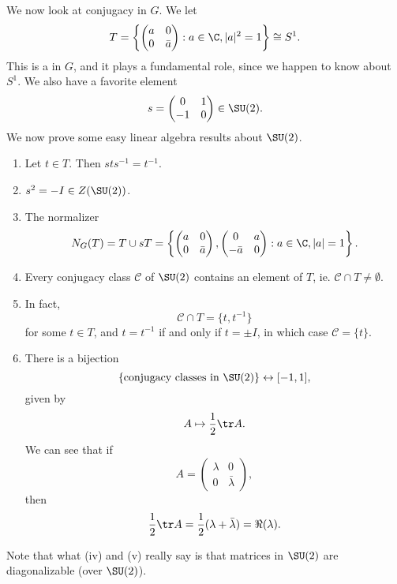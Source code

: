 \documentclass[a4paper]{article}
\begin{document}
We now look at conjugacy in $G$. We let
\[
  T = \left\{
    \begin{pmatrix}
      a & 0\\
      0 & \bar{a}
    \end{pmatrix}: a \in \C, |a|^2 = 1
  \right\} \cong S^1.
\]
This is a  in $G$, and it plays a fundamental role, since we happen to know about $S^1$. We also have a favorite element
\[
  s =
  \begin{pmatrix}
    0 & 1\\
    -1 & 0
  \end{pmatrix} \in \SU(2).
\]
We now prove some easy linear algebra results about $\SU(2)$.
\begin{lemma}\leavevmode
  \begin{enumerate}
    \item Let $t \in T$. Then $sts^{-1} = t^{-1}$.
    \item $s^2 = -I \in Z(\SU(2))$.
    \item The normalizer
      \[
        N_G(T) = T \cup sT =
        \left\{
          \begin{pmatrix}
            a & 0\\
            0 & \bar{a}
          \end{pmatrix},
          \begin{pmatrix}
            0 & a\\
            -\bar{a} & 0
          \end{pmatrix}: a \in \C, |a| = 1\right\}.
      \]
    \item Every conjugacy class $\mathcal{C}$ of $\SU(2)$ contains an element of $T$, ie. $\mathcal{C} \cap T \not= \emptyset$.

    \item In fact,
      \[
        \mathcal{C} \cap T = \{t, t^{-1}\}
      \]
      for some $t \in T$, and $t = t^{-1}$ if and only if $t = \pm I$, in which case $\mathcal{C} = \{t\}$.
    \item There is a bijection
      \[
        \{\text{conjugacy classes in }\SU(2)\} \leftrightarrow [-1, 1],
      \]
      given by
      \[
        A \mapsto \frac{1}{2} \tr A.
      \]
      We can see that if
      \[
        A =
        \begin{pmatrix}
          \lambda & 0\\
          0 & \bar{\lambda}
        \end{pmatrix},
      \]
      then
      \[
        \frac{1}{2}\tr A = \frac{1}{2}(\lambda + \bar{\lambda}) = \Re(\lambda).
      \]
  \end{enumerate}
\end{lemma}
Note that what (iv) and (v) really say is that matrices in $\SU(2)$ are diagonalizable (over $\SU(2)$).
\end{document}
